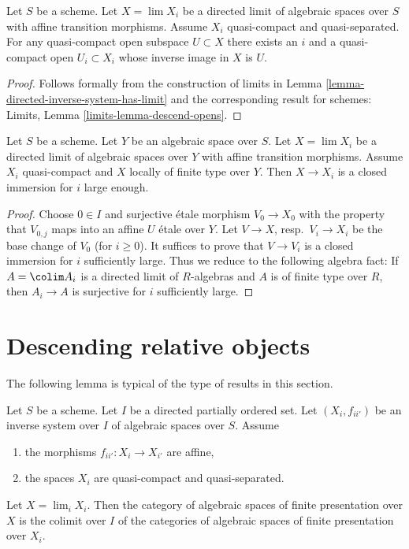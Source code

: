 \begin{lemma}
\label{lemma-descend-opens}
Let $S$ be a scheme. Let $X = \lim X_i$ be a directed limit of
algebraic spaces over $S$ with affine transition morphisms.
Assume $X_i$ quasi-compact and quasi-separated. For any quasi-compact
open subspace $U \subset X$ there exists an $i$ and a quasi-compact
open $U_i \subset X_i$ whose inverse image in $X$ is $U$.
\end{lemma}

\begin{proof}
Follows formally from the construction of limits in
Lemma \ref{lemma-directed-inverse-system-has-limit}
and the corresponding result for schemes:
Limits, Lemma \ref{limits-lemma-descend-opens}.
\end{proof}

\begin{lemma}
\label{lemma-finite-type-eventually-closed}
Let $S$ be a scheme. Let $Y$ be an algebraic space over $S$.
Let $X = \lim X_i$ be a directed limit of
algebraic spaces over $Y$ with affine transition morphisms. Assume $X_i$
quasi-compact and $X$ locally of finite type
over $Y$. Then $X \to X_i$ is a closed immersion for $i$ large enough.
\end{lemma}

\begin{proof}
Choose $0 \in I$ and surjective \'etale morphism
$V_0 \to X_0$ with the property that
$V_{0, j}$ maps into an affine $U$ \'etale over $Y$.
Let $V \to X$, resp.\ $V_i \to X_i$ be the base change
of $V_0$ (for $i \geq 0$). It suffices to prove that $V \to V_i$
is a closed immersion for $i$ sufficiently large. Thus we reduce
to the following algebra fact: If $A = \colim A_i$ is a directed
limit of $R$-algebras and $A$ is of finite type over $R$, then
$A_i \to A$ is surjective for $i$ sufficiently large.
\end{proof}






\section{Descending relative objects}
\label{section-descending-relative}

\noindent
The following lemma is typical of the type of results in this section.

\begin{lemma}
\label{lemma-descend-finite-presentation}
Let $S$ be a scheme. Let $I$ be a directed partially ordered set.
Let $(X_i, f_{ii'})$ be an inverse system over $I$ of algebraic spaces
over $S$. Assume
\begin{enumerate}
\item the morphisms $f_{ii'} : X_i \to X_{i'}$ are affine,
\item the spaces $X_i$ are quasi-compact and quasi-separated.
\end{enumerate}
Let $X = \lim_i X_i$. Then the category of algebraic spaces
of finite presentation over $X$ is the colimit over $I$ of the
categories of algebraic spaces of finite presentation over $X_i$.
\end{lemma}

